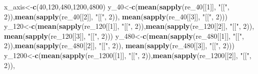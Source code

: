 \documentclass[
]{article}
\newenvironment{Shaded}{\begin{snugshade}}{\end{snugshade}}
\newcommand{\DecValTok}[1]{\textcolor[rgb]{0.00,0.00,0.81}{#1}}
\newcommand{\KeywordTok}[1]{\textcolor[rgb]{0.13,0.29,0.53}{\textbf{#1}}}
\newcommand{\NormalTok}[1]{#1}
\newcommand{\StringTok}[1]{\textcolor[rgb]{0.31,0.60,0.02}{#1}}
\begin{document}
\begin{Shaded}
\begin{Highlighting}[]
\NormalTok{x_axis<-}\KeywordTok{c}\NormalTok{(}\DecValTok{40}\NormalTok{,}\DecValTok{120}\NormalTok{,}\DecValTok{480}\NormalTok{,}\DecValTok{1200}\NormalTok{,}\DecValTok{4800}\NormalTok{)}
\NormalTok{y_}\DecValTok{40}\NormalTok{<-}\KeywordTok{c}\NormalTok{(}\KeywordTok{mean}\NormalTok{(}\KeywordTok{sapply}\NormalTok{(re_}\DecValTok{40}\NormalTok{[[}\DecValTok{1}\NormalTok{]], }\StringTok{"[["}\NormalTok{, }\DecValTok{2}\NormalTok{)),}\KeywordTok{mean}\NormalTok{(}\KeywordTok{sapply}\NormalTok{(re_}\DecValTok{40}\NormalTok{[[}\DecValTok{2}\NormalTok{]], }\StringTok{"[["}\NormalTok{, }\DecValTok{2}\NormalTok{)),}
        \KeywordTok{mean}\NormalTok{(}\KeywordTok{sapply}\NormalTok{(re_}\DecValTok{40}\NormalTok{[[}\DecValTok{3}\NormalTok{]], }\StringTok{"[["}\NormalTok{, }\DecValTok{2}\NormalTok{)))}
\NormalTok{y_}\DecValTok{120}\NormalTok{<-}\KeywordTok{c}\NormalTok{(}\KeywordTok{mean}\NormalTok{(}\KeywordTok{sapply}\NormalTok{(re_}\DecValTok{120}\NormalTok{[[}\DecValTok{1}\NormalTok{]], }\StringTok{"[["}\NormalTok{, }\DecValTok{2}\NormalTok{)),}\KeywordTok{mean}\NormalTok{(}\KeywordTok{sapply}\NormalTok{(re_}\DecValTok{120}\NormalTok{[[}\DecValTok{2}\NormalTok{]], }\StringTok{"[["}\NormalTok{, }\DecValTok{2}\NormalTok{)),}
        \KeywordTok{mean}\NormalTok{(}\KeywordTok{sapply}\NormalTok{(re_}\DecValTok{120}\NormalTok{[[}\DecValTok{3}\NormalTok{]], }\StringTok{"[["}\NormalTok{, }\DecValTok{2}\NormalTok{)))}
\NormalTok{y_}\DecValTok{480}\NormalTok{<-}\KeywordTok{c}\NormalTok{(}\KeywordTok{mean}\NormalTok{(}\KeywordTok{sapply}\NormalTok{(re_}\DecValTok{480}\NormalTok{[[}\DecValTok{1}\NormalTok{]], }\StringTok{"[["}\NormalTok{, }\DecValTok{2}\NormalTok{)),}\KeywordTok{mean}\NormalTok{(}\KeywordTok{sapply}\NormalTok{(re_}\DecValTok{480}\NormalTok{[[}\DecValTok{2}\NormalTok{]], }\StringTok{"[["}\NormalTok{, }\DecValTok{2}\NormalTok{)),}
        \KeywordTok{mean}\NormalTok{(}\KeywordTok{sapply}\NormalTok{(re_}\DecValTok{480}\NormalTok{[[}\DecValTok{3}\NormalTok{]], }\StringTok{"[["}\NormalTok{, }\DecValTok{2}\NormalTok{)))}
\NormalTok{y_}\DecValTok{1200}\NormalTok{<-}\KeywordTok{c}\NormalTok{(}\KeywordTok{mean}\NormalTok{(}\KeywordTok{sapply}\NormalTok{(re_}\DecValTok{1200}\NormalTok{[[}\DecValTok{1}\NormalTok{]], }\StringTok{"[["}\NormalTok{, }\DecValTok{2}\NormalTok{)),}\KeywordTok{mean}\NormalTok{(}\KeywordTok{sapply}\NormalTok{(re_}\DecValTok{1200}\NormalTok{[[}\DecValTok{2}\NormalTok{]], }\StringTok{"[["}\NormalTok{, }\DecValTok{2}\NormalTok{)),}

\end{Highlighting}
\end{Shaded}
\end{document}
